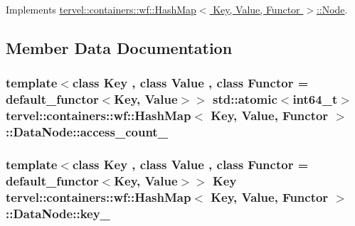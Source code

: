 Implements \hyperlink{classtervel_1_1containers_1_1wf_1_1_hash_map_1_1_node_ac7cc7039cfc134def7d936f00efc2155}{tervel\+::containers\+::wf\+::\+Hash\+Map$<$ Key, Value, Functor $>$\+::\+Node}.



\subsection{Member Data Documentation}
\hypertarget{classtervel_1_1containers_1_1wf_1_1_hash_map_1_1_data_node_ab90537febd882ad210231df69691acae}{}
\subsubsection[{access\+\_\+count\+\_\+}]{\setlength{\rightskip}{0pt plus 5cm}template$<$class Key , class Value , class Functor  = default\+\_\+functor$<$\+Key, Value$>$$>$ std\+::atomic$<$int64\+\_\+t$>$ {\bf tervel\+::containers\+::wf\+::\+Hash\+Map}$<$ Key, {\bf Value}, Functor $>$\+::Data\+Node\+::access\+\_\+count\+\_\+}\label{classtervel_1_1containers_1_1wf_1_1_hash_map_1_1_data_node_ab90537febd882ad210231df69691acae}
\hypertarget{classtervel_1_1containers_1_1wf_1_1_hash_map_1_1_data_node_a261f271577727ee5699af49fdaaa989a}{}
\subsubsection[{key\+\_\+}]{\setlength{\rightskip}{0pt plus 5cm}template$<$class Key , class Value , class Functor  = default\+\_\+functor$<$\+Key, Value$>$$>$ Key {\bf tervel\+::containers\+::wf\+::\+Hash\+Map}$<$ Key, {\bf Value}, Functor $>$\+::Data\+Node\+::key\+\_\+}\label{classtervel_1_1containers_1_1wf_1_1_hash_map_1_1_data_node_a261f271577727ee5699af49fdaaa989a}
\hypertarget{classtervel_1_1containers_1_1wf_1_1_hash_map_1_1_data_node_a92498a88201109a8cababeff699435a6}{}
